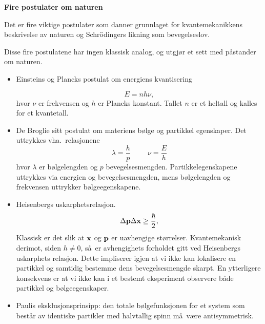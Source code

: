 \Large
\begin{center}
   \begin{minipage}{0.8\textwidth}
       \vspace*{0.5cm}
       \begin{center}
            { \LARGE \bf Fire postulater om naturen}
       \end{center}

Det er fire viktige postulater som danner grunnlaget for kvantemekanikkens
beskrivelse av naturen og Schr\"odingers likning som bevegelseslov.

Disse fire postulatene har ingen klassisk analog, og utgj\o r et sett
med  p\aa stander om naturen. 

\begin{itemize} 
\item Einsteins og Plancks postulat om energiens kvantisering 
     
      \[
          E=nh\nu,
      \]
       hvor $\nu$ er frekvensen og $h$ er Plancks konstant. Tallet 
       $n$ er et heltall og kalles for et kvantetall. 
\item De Broglie sitt postulat om materiens b\o lge og partikkel
      egenskaper. Det uttrykkes vha.~relasjonene
\[
     \lambda =\frac{h}{p}  \hspace{1cm} \nu=\frac{E}{h}    
\]
hvor $\lambda$ er b\o lgelengden og $p$ bevegelsesmengden.
Partikkelegenskapene uttrykkes via energien og bevegelsesmengden,
mens b\o lgelengden og frekvensen uttrykker b\o lgeegenskapene.
\item Heisenbergs uskarphetsrelasjon. 
\[
    \Delta {\bf p}\Delta {\bf x} \geq \frac{\hbar}{2},
\]
Klassisk er det slik at ${\bf x}$ og ${\bf p}$ er uavhengige st\o rrelser.
Kvantemekanisk derimot, siden $h\ne 0$, s\aa\ er avhengighets forholdet gitt ved
Heisenbergs uskarphets relasjon. Dette impliserer igjen at vi ikke kan 
lokalisere en partikkel og samtidig bestemme dens bevegelsesmengde skarpt. 
En ytterligere konsekvens er at vi ikke kan i et bestemt eksperiment observere
b\aa de partikkel og b\o lgeegenskaper. 

\item Paulis eksklusjonsprinsipp: den totale b\o lgefunksjonen for et 
      system som best\aa r av identiske partikler med halvtallig
      spinn m\aa\ v\ae re antisymmetrisk.  
\end{itemize}

 
\end{minipage}
\end{center}


